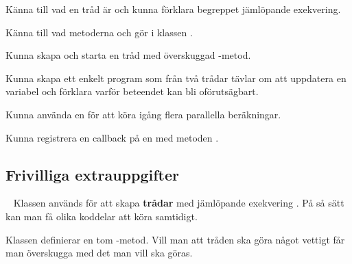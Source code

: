 
\ifPreSolution

\Exercise{\ExeWeekFOURTEEN}\label{exe:W14}

\begin{Goals}
\item Känna till vad en tråd är och kunna förklara begreppet jämlöpande exekvering.
\item Känna till vad metoderna  och  gör i klassen .
\item Kunna skapa och starta en tråd med överskuggad -metod.
\item Kunna skapa ett enkelt program som från två trådar tävlar om att uppdatera en variabel och förklara varför beteendet kan bli oförutsägbart.
\item Kunna använda en  för att köra igång flera parallella beräkningar.
\item Kunna registrera en callback på en  med metoden .
\end{Goals}


\else

\ExerciseSolution{\ExeWeekFOURTEEN}

\fi


\subsection{Frivilliga extrauppgifter}




\QUESTBEGIN

\Task  \what~   Klassen  används för att skapa  \textbf{trådar} med jämlöpande exekvering . På så sätt kan man få olika koddelar att köra samtidigt.

Klassen  definierar en tom -metod. Vill man att tråden ska göra något vettigt får man överskugga  med det man vill ska göras.

